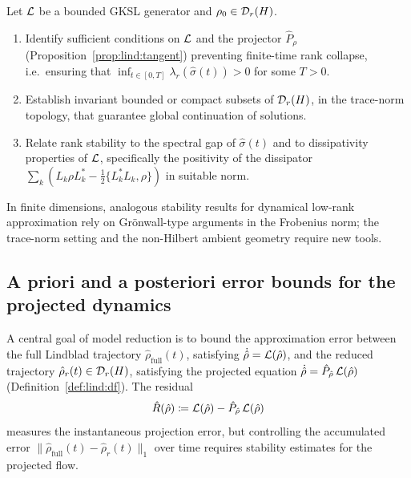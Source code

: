 \begin{problem}
\label{prob:lind:global_existence}
Let $\mathcal{L}$ be a bounded GKSL generator and $\rho_0 \in \mathcal{D}_{r}(H)$.
\begin{enumerate}
\item[\textup{(a)}] Identify sufficient conditions on $\mathcal{L}$ and the
    projector $\hat P_\rho$ (Proposition~\ref{prop:lind:tangent})
    preventing finite-time rank collapse, i.e.\ ensuring that
    $\inf_{t \in [0,T]} \lambda_r(\hat\sigma(t)) > 0$ for some $T > 0$.
\item[\textup{(b)}] Establish invariant bounded or compact subsets of
    $\mathcal{D}_{r}(H)$, in the trace-norm topology, that guarantee global
    continuation of solutions.
\item[\textup{(c)}] Relate rank stability to the spectral gap of
    $\hat\sigma(t)$ and to dissipativity properties of $\mathcal{L}$,
    specifically the positivity of the dissipator
    $\sum_k (L_k \rho L_k^* - \tfrac{1}{2}\{L_k^* L_k, \rho\})$
    in suitable norm.
\end{enumerate}
In finite dimensions, analogous stability results for dynamical
low-rank approximation rely on Grönwall-type arguments in the
Frobenius norm; the trace-norm setting and the non-Hilbert ambient
geometry require new tools.
\end{problem}

\subsection*{A priori and a posteriori error bounds for the projected dynamics}

A central goal of model reduction is to bound the approximation
error between the full Lindblad trajectory
$\hat\rho_{\mathrm{full}}(t)$, satisfying
$\dot{\hat\rho} = \mathcal{L}(\hat\rho)$, and the reduced trajectory
$\hat\rho_r(t) \in \mathcal{D}_{r}(H)$, satisfying the projected equation
$\dot{\hat\rho} = \hat P_{\hat\rho}\,\mathcal{L}(\hat\rho)$
(Definition~\ref{def:lind:df}). The residual
\begin{equation}
    \hat R(\hat\rho)
    \coloneqq \mathcal{L}(\hat\rho) - \hat P_{\hat\rho}\,\mathcal{L}(\hat\rho)
\end{equation}
measures the instantaneous projection error, but controlling the
accumulated error $\|\hat\rho_{\mathrm{full}}(t) - \hat\rho_r(t)\|_1$
over time requires stability estimates for the projected flow.

